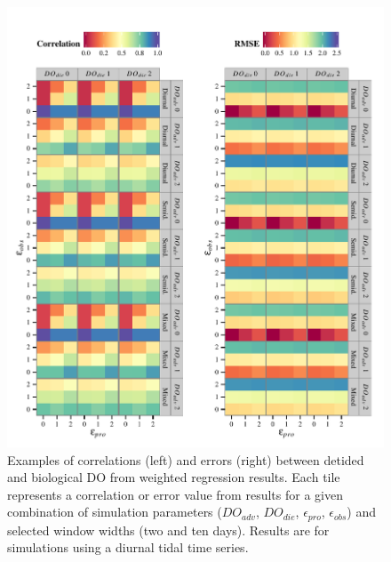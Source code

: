 \documentclass[letterpaper,12pt,oneside]{article}\usepackage[]{graphicx}\usepackage[]{color}
\makeatletter
\def\maxwidth{ %
  \ifdim\Gin@nat@width>\linewidth
    \linewidth
  \else
    \Gin@nat@width
  \fi
}
\newenvironment{knitrout}{}{} %
\makeatother
\begin{document}
\centering\vspace*{\fill}
\begin{knitrout}
\color{fgcolor}\begin{figure}[!ht]


{\centering \includegraphics[width=\maxwidth]{figure/err_surf} 

}

\caption[Examples of correlations (left) and errors (right) between detided and biological \ac{DO} from weighted regression results]{Examples of correlations (left) and errors (right) between detided and biological \ac{DO} from weighted regression results.  Each tile represents a correlation or error value from results for a given combination of simulation parameters ($DO_{adv}$, $DO_{die}$, $\epsilon_{pro}$, $\epsilon_{obs}$) and selected window widths (two and ten days).  Results are for simulations using a diurnal tidal time series.\label{fig:err_surf}}
\end{figure}


\end{knitrout}
\vfill
\clearpage
\end{document}
